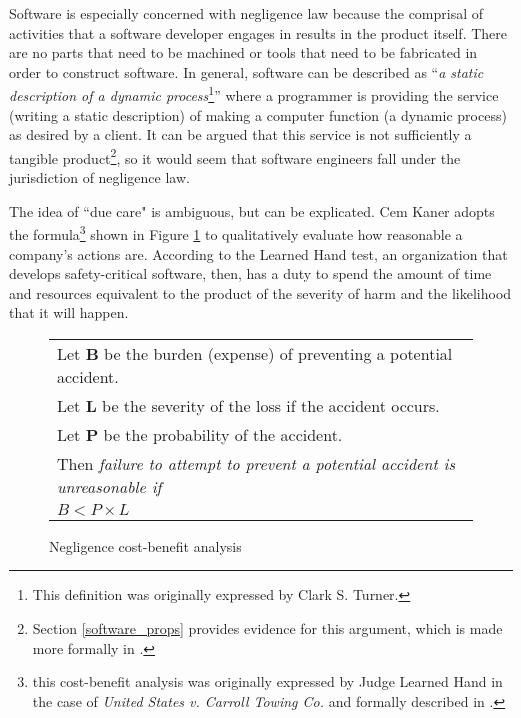Software is especially concerned with negligence law because the comprisal of
activities that a software developer engages in results in the product itself.
There are no parts that need to be machined or tools that need to be fabricated
in order to construct software. In general, software can be described as 
``\textit{a static description of a dynamic process}\footnote{This definition
was originally expressed by Clark S. Turner.}'' where a programmer is providing
the service (writing a static description) of making a computer function (a
dynamic process) as desired by a client. It can be argued that this service is
not sufficiently a tangible product\footnote{Section \ref{software_props}
provides evidence for this argument, which is made more formally in
\cite{Turner2000}.}, so it would seem that software engineers fall under the
jurisdiction of negligence law.

The idea of ``due care" is ambiguous, but can be explicated. Cem Kaner adopts
the formula\footnote{this cost-benefit analysis was originally expressed by
Judge Learned Hand in the case of  \textit{United States v. Carroll Towing Co.}
and formally described in \cite{Kaner_neg_1995}.} shown in Figure 
\ref{fig:negligence} to qualitatively evaluate how reasonable a company's
actions are. According to the Learned Hand test, an organization that develops 
safety-critical software, then, has a duty to spend the amount of time and
resources equivalent to the product of the severity of harm and the likelihood
that it will happen.

\begin{figure}
\begin{narrow}{-1.5in}{-1.5in}\begin{center}
\begin{tabular}{|l|}
\hline
	Let \textbf{B} be the burden (expense) of preventing a potential accident.\\
	Let \textbf{L} be the severity of the loss if the accident occurs.\\
	Let \textbf{P} be the probability of the accident.\\[6pt]
	Then \textit{failure to attempt to prevent a potential accident is 
	unreasonable if}\\[8pt]

      \centerline{\(B < P \times L\)}
\\[3pt]
\hline
\end{tabular}
\end{center}\end{narrow}
\caption{Negligence cost-benefit analysis}
\label{fig:negligence}
\end{figure}

